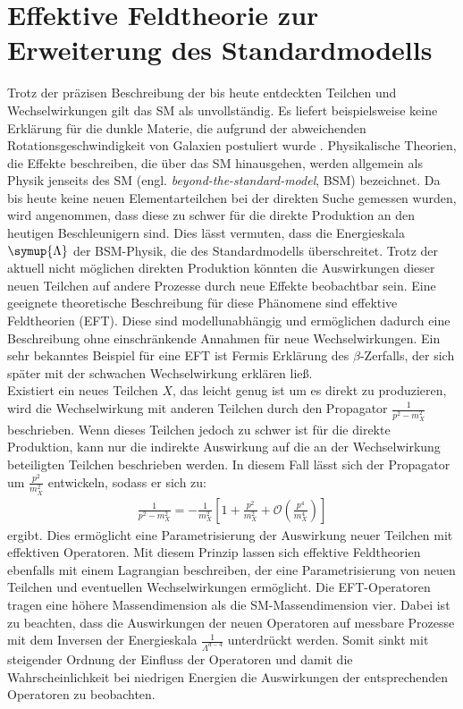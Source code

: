 \section{Effektive Feldtheorie zur Erweiterung des Standardmodells}
Trotz der präzisen Beschreibung der bis heute entdeckten Teilchen und Wechselwirkungen gilt das SM als unvollständig. Es liefert beispielsweise keine Erklärung für die dunkle Materie, die aufgrund der abweichenden Rotationsgeschwindigkeit von Galaxien postuliert wurde \cite{Bertone:2016nfn}. Physikalische Theorien, die Effekte beschreiben, die über das SM hinausgehen, werden allgemein als Physik jenseits des SM (engl. \textit{beyond-the-standard-model}, BSM) bezeichnet. Da bis heute keine neuen Elementarteilchen bei der direkten Suche gemessen wurden, wird angenommen, dass diese zu schwer für die direkte Produktion an den heutigen Beschleunigern sind. Dies lässt vermuten, dass die Energieskala $\symup{\Lambda}$ der BSM-Physik, die des Standardmodells überschreitet. Trotz der aktuell nicht möglichen direkten Produktion könnten die Auswirkungen dieser neuen Teilchen auf andere Prozesse durch neue Effekte beobachtbar sein. Eine geeignete theoretische Beschreibung für diese Phänomene sind effektive Feldtheorien (EFT). Diese sind modellunabhängig und ermöglichen dadurch eine Beschreibung ohne einschränkende Annahmen für neue Wechselwirkungen. Ein sehr bekanntes Beispiel für eine EFT ist Fermis Erklärung des $\beta$-Zerfalls, der sich später mit der schwachen Wechselwirkung erklären ließ\cite{Fermi1934}.\\
Existiert ein neues Teilchen $X$, das leicht genug ist um es direkt zu produzieren, wird die Wechselwirkung mit anderen Teilchen durch den Propagator $\frac{1}{p^2 -m_X^2}$ beschrieben. Wenn dieses Teilchen jedoch zu schwer ist für die direkte Produktion, kann nur die indirekte Auswirkung auf die an der Wechselwirkung beteiligten Teilchen beschrieben werden. In diesem Fall lässt sich der Propagator um $\frac{p^2}{m_X^2}$ entwickeln, sodass er sich zu:
\begin{align}
    \frac{1}{p^2 -m_X^2} = -\frac{1}{m_X^2}\left[ 1 + \frac{p^2}{m_X^2} + \mathcal{O}\left(\frac{p^4}{m_X^4}\right)\right]
\end{align}
ergibt. Dies ermöglicht eine Parametrisierung der Auswirkung neuer Teilchen mit effektiven Operatoren.
Mit diesem Prinzip lassen sich effektive Feldtheorien ebenfalls mit einem Lagrangian beschreiben, der eine Parametrisierung von neuen Teilchen und eventuellen Wechselwirkungen ermöglicht. Die EFT-Operatoren tragen eine höhere Massendimension als die SM-Massendimension vier. Dabei ist zu beachten, dass die Auswirkungen der neuen Operatoren auf messbare Prozesse mit dem Inversen der Energieskala $\frac{1}{\Lambda^{d-4}}$ unterdrückt werden. Somit sinkt mit steigender Ordnung der Einfluss der Operatoren und damit die Wahrscheinlichkeit bei niedrigen Energien die Auswirkungen der entsprechenden Operatoren zu beobachten.\\
